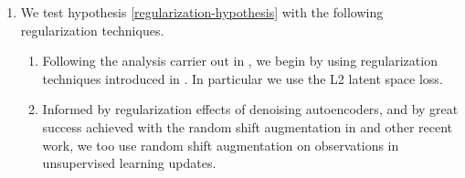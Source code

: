 \begin{enumerate}
\begin{enumerate}
		\end{enumerate}
\item We test hypothesis \ref{regularization-hypothesis} with the following regularization techniques.
		\begin{enumerate}
				\item Following the analysis carrier out in \cite{sac+ae}, we begin by using
						regularization techniques introduced in \cite{ghosh2019variational}.
						In particular we use the L2 latent space loss.
			\item Informed by regularization effects of denoising autoencoders, and by great success achieved
					with the random shift augmentation in \cite{drqv1, drqv2} and other recent work,
					we too use random shift augmentation on observations in unsupervised learning updates.
		\end{enumerate}
\end{enumerate}




